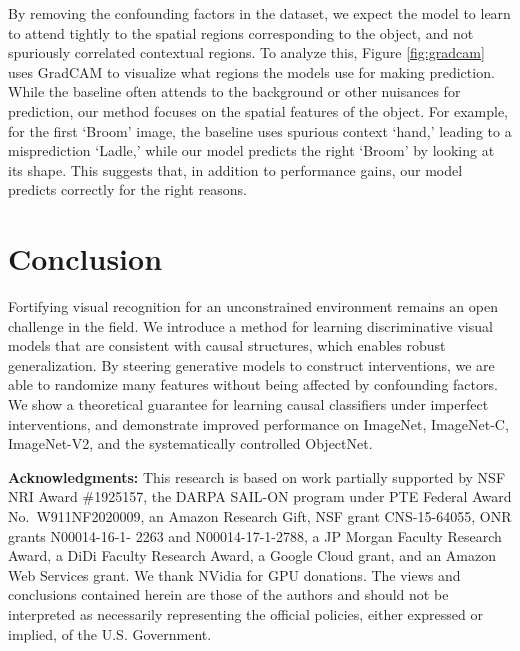 \documentclass[final]{cvpr}
\begin{document}
By removing the confounding factors in the dataset, we expect the model to learn to attend tightly to the spatial regions corresponding to the object, and not spuriously correlated contextual regions. To analyze this, Figure \ref{fig:gradcam} uses GradCAM \cite{gradcam} to visualize what regions the models use for making prediction. While
the baseline often attends to the background or other nuisances for prediction, our method focuses on the spatial features of the object. For example, for the first `Broom' image, the baseline uses spurious context `hand,' leading to a misprediction `Ladle,' while our model predicts the right `Broom' by looking at its shape. This suggests that, in addition to performance gains, our model predicts correctly for the right reasons. 











 \section{Conclusion}

Fortifying visual recognition for an unconstrained environment remains an open challenge in the field.
We introduce a method for learning discriminative visual models that are consistent with causal structures, which enables robust generalization. By steering generative models to construct interventions, we are able to randomize many features without being affected by confounding factors. We show a theoretical guarantee for  learning causal classifiers under imperfect interventions, and demonstrate improved performance on ImageNet, ImageNet-C, ImageNet-V2, and the systematically controlled ObjectNet.  

{\small
\textbf{Acknowledgments:} This research is based on work partially supported by NSF NRI Award \#1925157, the DARPA SAIL-ON program under PTE Federal Award No.\ W911NF2020009, an Amazon Research Gift, NSF grant CNS-15-64055, ONR grants N00014-16-1- 2263 and N00014-17-1-2788, a JP Morgan Faculty Research Award, a DiDi Faculty Research Award, a Google Cloud grant, and an Amazon Web Services grant. We thank NVidia for GPU donations. The views and conclusions contained herein are those of the authors and should not be interpreted as necessarily representing the official policies, either expressed or implied, of the U.S. Government.
}

{
\small

}
\end{document}
